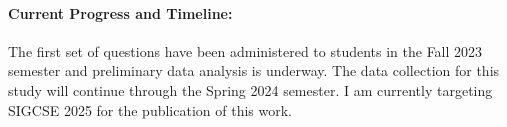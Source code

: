 \documentclass[authorversion,nonacm]{acmart}
\begin{document}
\paragraph{Current Progress and Timeline:} The first set of questions have been 
administered to students in the Fall 2023 semester and preliminary data analysis 
is underway. The data collection for this study will continue through the Spring
2024 semester. I am currently targeting SIGCSE 2025 for the publication of this
work.



\balance

\end{document}
